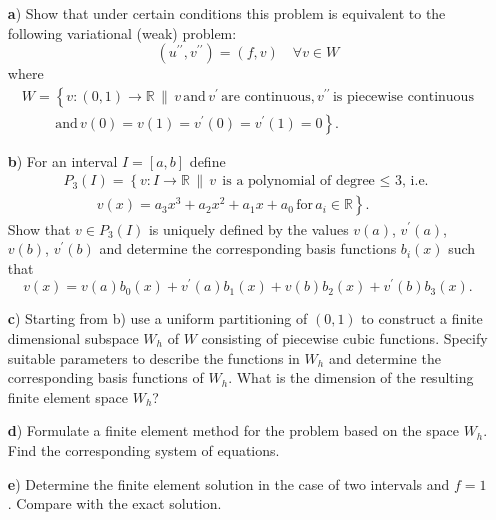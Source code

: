 \documentclass{article}
\begin{document}
\begin{itemize}
\item[\textsf{\textbf{a})}] Show that under certain conditions this problem is equivalent to the following variational (weak)
problem:
\begin{equation}
\left( u^{\prime\prime}, v^{\prime\prime} \right) =  \left( f, v \right) \quad \forall v \in W \nonumber
\end{equation}
where
\begin{equation*}
\begin{gathered}
W = \left\{ v : \left(0,1\right) \rightarrow \mathbb{R} \, \| \, v \, \mbox{and} \, v^\prime \, \mbox{are continuous,} \, v^{\prime\prime} \, \mbox{is piecewise continuous} \right. \nonumber \\
\hspace{1cm} \left.  \mbox{and} \, v(0)=v(1) = v^\prime(0)=v^\prime(1) =0 \right\}. \nonumber
\end{gathered}
\end{equation*}

\item[\textsf{\textbf{b})}] For an interval $I = [a, b]$ define
\begin{equation}
\begin{gathered}
P_3\left(I\right) =\left\{ v : I \rightarrow \mathbb{R} \, \| \, v \, \mbox{is a polynomial of degree $\le$ 3, i.e.} \right. \\
\hspace{1cm} \left. v(x) = a_3 x^3 + a_2 x^2 + a_1 x + a_0 \, \mbox{for} \, a_i \in \mathbb{R} \right\}. \nonumber
\end{gathered}
\end{equation}
Show that $v \in P_3(I)$ is uniquely defined by the values $v(a)$, $v^\prime(a)$, $v(b)$, $v^\prime(b)$ and determine the
corresponding basis functions $b_i(x)$ such that
\begin{equation}
v\left(x\right) = v(a)b_0\left(x\right) + v^\prime(a)b_1\left(x\right) + v(b)b_2\left(x\right) + v^\prime(b) b_3\left(x\right). \nonumber
\end{equation}

\item[\textsf{\textbf{c})}] Starting from b) use a uniform partitioning of $(0, 1)$ to construct a finite dimensional subspace $W_h$ of $W$ consisting of piecewise cubic functions. Specify suitable parameters to describe the functions in $W_h$ and determine the corresponding basis functions of $W_h$. What is the dimension of the resulting finite element space $W_h$?

\item[\textsf{\textbf{d})}] Formulate a finite element method for the problem based on the space $W_h$. Find the corresponding system of equations.

\item[\textsf{\textbf{e})}] Determine the finite element solution in the case of two intervals and ${f = 1}$. Compare with the exact solution.

\end{itemize} 
\end{document}
